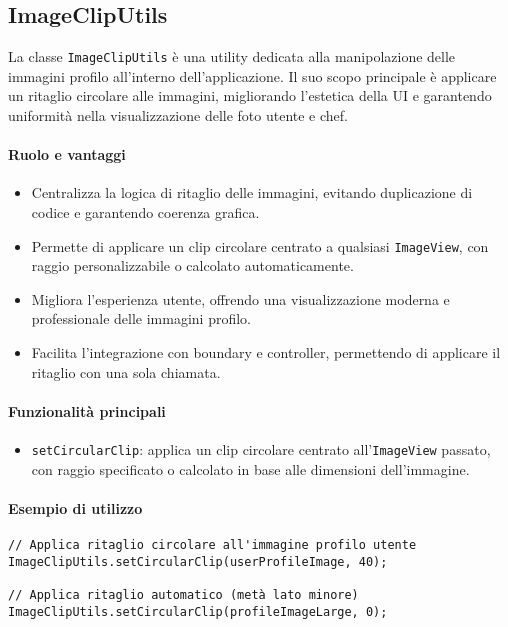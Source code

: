 \subsection{ImageClipUtils}
La classe \texttt{ImageClipUtils} è una utility dedicata alla manipolazione delle immagini profilo all'interno dell'applicazione. Il suo scopo principale è applicare un ritaglio circolare alle immagini, migliorando l'estetica della UI e garantendo uniformità nella visualizzazione delle foto utente e chef.

\paragraph{Ruolo e vantaggi}
\begin{itemize}
    \item Centralizza la logica di ritaglio delle immagini, evitando duplicazione di codice e garantendo coerenza grafica.
    \item Permette di applicare un clip circolare centrato a qualsiasi \texttt{ImageView}, con raggio personalizzabile o calcolato automaticamente.
    \item Migliora l'esperienza utente, offrendo una visualizzazione moderna e professionale delle immagini profilo.
    \item Facilita l'integrazione con boundary e controller, permettendo di applicare il ritaglio con una sola chiamata.
\end{itemize}

\paragraph{Funzionalità principali}
\begin{itemize}
    \item \texttt{setCircularClip}: applica un clip circolare centrato all'\texttt{ImageView} passato, con raggio specificato o calcolato in base alle dimensioni dell'immagine.
\end{itemize}

\paragraph{Esempio di utilizzo}
\begin{verbatim}
// Applica ritaglio circolare all'immagine profilo utente
ImageClipUtils.setCircularClip(userProfileImage, 40);

// Applica ritaglio automatico (metà lato minore)
ImageClipUtils.setCircularClip(profileImageLarge, 0);
\end{verbatim}

